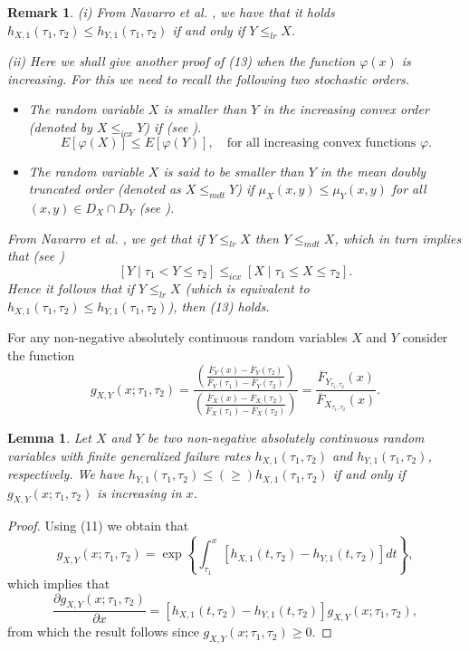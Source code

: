 \documentclass[11pt]{article}
\newtheorem{lemma}{Lemma}
\newtheorem{remark}{Remark}
\begin{document}
 
\begin{remark} (i) From Navarro et al. \cite[Proposition 2.1]{Navarro1997}, we have that it holds $h_{X,1}(\tau_1,\tau_2)\leq h_{Y,1}(\tau_1,\tau_2)$ if and only if $Y \leq_{lr} X$.
	
	\noindent (ii) Here we shall give another proof of (13) when the function $\varphi(x)$ is increasing. For this we need to recall the following two stochastic orders.
	\begin{itemize}
		\item[$\bullet$] The random variable $X$ is smaller than $Y$ in the increasing convex order (denoted by $X \leq_{icx} Y$) if (see \cite{Shaked2007}).
		$$ \textstyle E[\varphi(X)] \leq E[\varphi(Y)], \quad \text{for all increasing convex functions } \varphi. $$
		
		\item[$\bullet$] The random variable $X$ is said to be smaller than $Y$ in the mean doubly truncated order (denoted as $X \leq_{mdt} Y$) if $\mu_X(x,y) \leq \mu_Y(x,y)$ for all $(x,y)\in D_X \cap D_Y$ (see \cite{Navarro1997}).
	\end{itemize}
	From Navarro et al. \cite[Proposition 3.3]{Navarro1997}, we get that if $Y \leq_{lr} X$ then $Y \leq_{mdt} X$, which in turn implies that (see \cite[Proposition 3.1]{Navarro1997})
	$$ \textstyle [Y \mid \tau_1 < Y \leq \tau_2] \leq_{icx} [X \mid \tau_1 \leq X \leq \tau_2]. $$
	Hence it follows that if $Y \leq_{lr} X$ (which is equivalent to $h_{X,1}(\tau_1,\tau_2) \leq h_{Y,1}(\tau_1,\tau_2)$), then (13) holds.
\end{remark}

For any non-negative absolutely continuous random variables $X$ and $Y$ consider the function
\begin{equation} \textstyle
	g_{X,Y} (x;\tau_1,\tau_2) = \frac{\left(\frac{\overline{F}_Y (x) - \overline{F}_Y (\tau_2)}{\overline{F}_Y (\tau_1) - \overline{F}_Y (\tau_2)}\right)}{\left(\frac{\overline{F}_X (x) - \overline{F}_X (\tau_2)}{\overline{F}_X (\tau_1) - \overline{F}_X (\tau_2)}\right)} = \frac{\overline{F}_{Y_{\tau_1,\tau_2}} (x)}{\overline{F}_{X_{\tau_1,\tau_2}} (x)}.
\end{equation}

 
\begin{lemma}
	Let $X$ and $Y$ be two non-negative absolutely continuous random variables with finite generalized failure rates $h_{X,1} (\tau_1,\tau_2)$ and $h_{Y,1} (\tau_1,\tau_2)$, respectively. We have $ h_{Y,1} (\tau_1,\tau_2) \leq (\geq) h_{X,1} (\tau_1,\tau_2) $ if and only if $g_{X,Y} (x;\tau_1,\tau_2)$ is increasing in $x$.
\end{lemma}
\begin{proof}
	Using (11) we obtain that
	$$ \textstyle g_{X,Y} (x;\tau_1,\tau_2) = \exp\left\{ \int_{\tau_1}^x \left[ h_{X,1} (t,\tau_2) - h_{Y,1} (t,\tau_2) \right] dt \right\}, $$
	which implies that
	$$ \textstyle \frac{\partial g_{X,Y} (x;\tau_1,\tau_2)}{\partial x} = \left[ h_{X,1} (t,\tau_2) - h_{Y,1} (t,\tau_2) \right] g_{X,Y} (x;\tau_1,\tau_2), $$
	from which the result follows since $g_{X,Y} (x;\tau_1,\tau_2) \geq 0$.
\end{proof}
\end{document}

